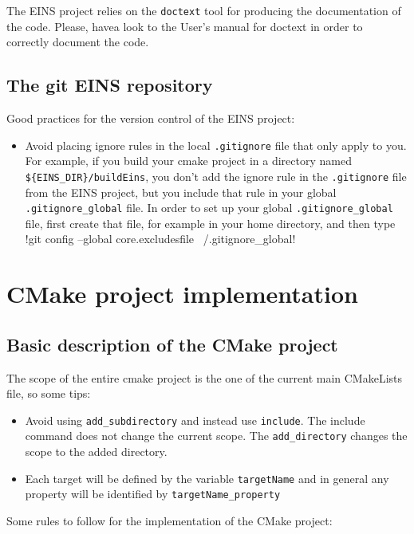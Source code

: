 \documentclass[a4paper,11pt]{report}
\begin{document}
The EINS project relies on the \verb!doctext! tool for producing the
documentation of the code. Please, havea look to the User's manual for
doctext \cite{doctext} in order to correctly document the code.


\section{The git EINS repository}

Good practices for the version control of the EINS project:
\begin{itemize}
\item Avoid placing ignore rules in the local \verb!.gitignore! file
  that only apply to you. For example, if you build your cmake
  project in a directory named \verb!${EINS_DIR}/buildEins!, you don't
  add the ignore rule in the \verb!.gitignore! file from the EINS
  project, but you include that rule in your global \verb!.gitignore_global!
  file. In order to set up your global \verb!.gitignore_global! file, first
  create that file, for example in your home directory, and then type
  !git config --global core.excludesfile ~/.gitignore_global!
\end{itemize}



\chapter{CMake project implementation}

\section{Basic description of the CMake project}

The scope of the entire cmake project is the one of the current main
CMakeLists file, so some tips:

\begin{itemize}
\item Avoid using \verb!add_subdirectory! and instead use
  \verb!include!. The include command does not change the current
  scope. The \verb!add_directory! changes the scope to the added
  directory.
\item Each target will be defined by the variable \verb!targetName!
  and in general any property will be identified by
  \verb!targetName_property!
\end{itemize}

\noindent Some rules to follow for the implementation of the CMake project:
\end{document}
